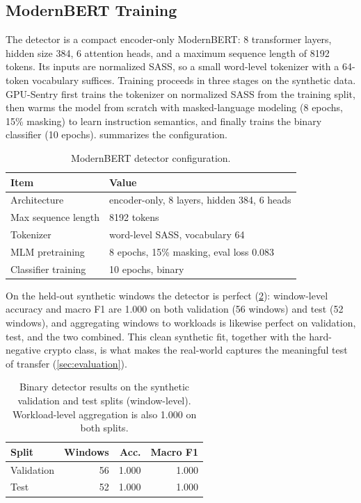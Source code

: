 \subsection{ModernBERT Training}

The detector is a compact encoder-only ModernBERT: 8 transformer layers, hidden size 384, 6 attention heads, and a maximum sequence length of 8192 tokens. Its inputs are normalized SASS, so a small word-level tokenizer with a 64-token vocabulary suffices. Training proceeds in three stages on the synthetic data. GPU-Sentry first trains the tokenizer on normalized SASS from the training split, then warms the model from scratch with masked-language modeling (8 epochs, 15\% masking) to learn instruction semantics, and finally trains the binary classifier (10 epochs).  summarizes the configuration.

\begin{table}[t]
    \centering
    \caption{ModernBERT detector configuration.}
    \label{tab:training}
    \small
    \begin{tabular}{@{}ll@{}}
        \toprule
        Item & Value \\
        \midrule
        Architecture & encoder-only, 8 layers, hidden 384, 6 heads \\
        Max sequence length & 8192 tokens \\
        Tokenizer & word-level SASS, vocabulary 64 \\
        MLM pretraining & 8 epochs, 15\% masking, eval loss 0.083 \\
        Classifier training & 10 epochs, binary \\
        \bottomrule
    \end{tabular}
\end{table}

On the held-out synthetic windows the detector is perfect (\cref{tab:synthetic_results}): window-level accuracy and macro F1 are 1.000 on both validation (56 windows) and test (52 windows), and aggregating windows to workloads is likewise perfect on validation, test, and the two combined. This clean synthetic fit, together with the hard-negative crypto class, is what makes the real-world captures the meaningful test of transfer (\cref{sec:evaluation}).

\begin{table}[t]
    \centering
    \caption{Binary detector results on the synthetic validation and test splits (window-level). Workload-level aggregation is also 1.000 on both splits.}
    \label{tab:synthetic_results}
    \small
    \begin{tabular}{lrrr}
        \toprule
        Split & Windows & Acc. & Macro F1 \\
        \midrule
        Validation & 56 & 1.000 & 1.000 \\
        Test & 52 & 1.000 & 1.000 \\
        \bottomrule
    \end{tabular}
\end{table}


